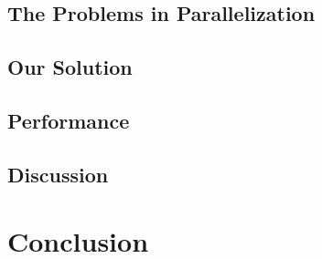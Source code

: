 \documentclass[english,12pt]{article}
\theoremstyle{algorithm}
\begin{document}
\subsection{The Problems in Parallelization}


\subsection{Our Solution}


\subsection{Performance}


\subsection{Discussion}


\section{Conclusion}




\end{document}
